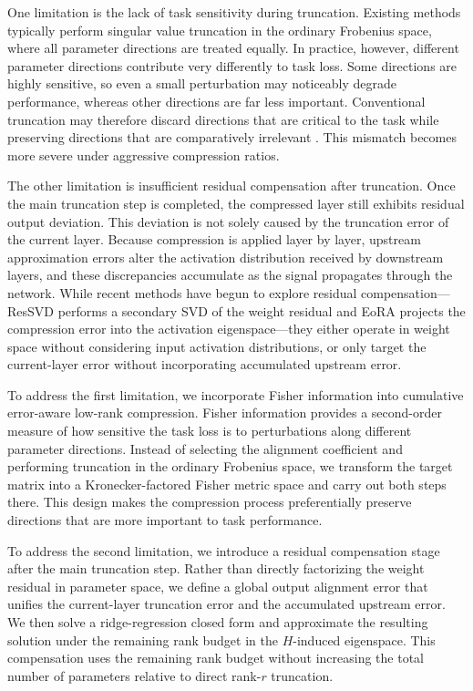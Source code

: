 \documentclass[a4paper,fleqn]{cas-dc}
\begin{document}
One limitation is the lack of task sensitivity during truncation. Existing methods typically perform singular value truncation in the ordinary Frobenius space, where all parameter directions are treated equally. In practice, however, different parameter directions contribute very differently to task loss. Some directions are highly sensitive, so even a small perturbation may noticeably degrade performance, whereas other directions are far less important. Conventional truncation may therefore discard directions that are critical to the task while preserving directions that are comparatively irrelevant \citep{li2025soco}. This mismatch becomes more severe under aggressive compression ratios.

The other limitation is insufficient residual compensation after truncation. Once the main truncation step is completed, the compressed layer still exhibits residual output deviation. This deviation is not solely caused by the truncation error of the current layer. Because compression is applied layer by layer, upstream approximation errors alter the activation distribution received by downstream layers, and these discrepancies accumulate as the signal propagates through the network. While recent methods have begun to explore residual compensation---ResSVD \citep{bai2025ressvd} performs a secondary SVD of the weight residual and EoRA \citep{liu2025eora} projects the compression error into the activation eigenspace---they either operate in weight space without considering input activation distributions, or only target the current-layer error without incorporating accumulated upstream error.

To address the first limitation, we incorporate Fisher information into cumulative error-aware low-rank compression. Fisher information provides a second-order measure of how sensitive the task loss is to perturbations along different parameter directions. Instead of selecting the alignment coefficient and performing truncation in the ordinary Frobenius space, we transform the target matrix into a Kronecker-factored Fisher metric space and carry out both steps there. This design makes the compression process preferentially preserve directions that are more important to task performance.

To address the second limitation, we introduce a residual compensation stage after the main truncation step. Rather than directly factorizing the weight residual in parameter space, we define a global output alignment error that unifies the current-layer truncation error and the accumulated upstream error. We then solve a ridge-regression closed form and approximate the resulting solution under the remaining rank budget in the $H$-induced eigenspace. This compensation uses the remaining rank budget without increasing the total number of parameters relative to direct rank-$r$ truncation.
\end{document}
